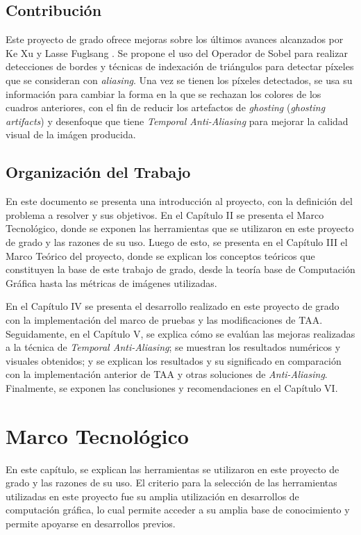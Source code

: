 \documentclass[pregrado]{tesis-usb} %
\begin{document}
\section{Contribución}
Este proyecto de grado ofrece mejoras sobre los últimos avances alcanzados por Ke Xu y Lasse Fuglsang \cite{Fuglsand2016, XU2016}. Se propone el uso del Operador de Sobel para realizar detecciones de bordes y técnicas de indexación de triángulos para detectar píxeles que se consideran con \textit{aliasing}. Una vez se tienen los píxeles detectados, se usa su información para cambiar la forma en la que se rechazan los colores de los cuadros anteriores, con el fin de reducir los artefactos de \textit{ghosting} (\textit{ghosting artifacts})  y desenfoque que tiene \textit{Temporal Anti-Aliasing} para mejorar la calidad visual de la imágen producida.

\section{Organización del Trabajo}
En este documento se presenta una introducción al proyecto, con la definición del problema a resolver y sus objetivos. En el Capítulo II se presenta el Marco Tecnológico, donde se exponen las herramientas que se utilizaron en este proyecto de grado y las razones de su uso. Luego de esto, se presenta en el Capítulo III el Marco Teórico del proyecto, donde se explican los conceptos teóricos que constituyen la base de este trabajo de grado, desde la teoría base de Computación Gráfica hasta las métricas de imágenes utilizadas. 

En el Capítulo IV se presenta el desarrollo realizado en este proyecto de grado con la implementación del marco de pruebas y las modificaciones de TAA. Seguidamente, en el Capítulo V, se explica cómo se evalúan las mejoras realizadas a la técnica de \textit{Temporal Anti-Aliasing}; se muestran los resultados numéricos y visuales obtenidos; y se explican los resultados y su significado en comparación con la implementación anterior de TAA y otras soluciones de \textit{Anti-Aliasing}. Finalmente, se exponen las conclusiones y recomendaciones en el Capítulo VI.



\chapter{Marco Tecnológico}
En este capítulo, se explican las herramientas se utilizaron en este proyecto de grado y las razones de su uso. El criterio para la selección de las herramientas utilizadas en este proyecto fue su amplia utilización en desarrollos de computación gráfica, lo cual permite acceder a su amplia base de conocimiento y permite apoyarse en desarrollos previos. 
\end{document}
